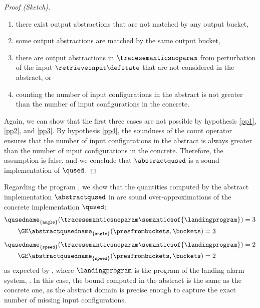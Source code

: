 \begin{proof}[Proof (Sketch)]
  \begin{enumerate}[label=(\alph*)]
    \item \label{qq1} there exist output abstractions that are not matched by any output bucket,
    \item \label{qq2} some output abstractions are matched by the same output bucket,
    \item \label{qq3} there are output abstractions in $\tracesemanticsnoparam$ from perturbation of the input $\retrieveinput\defstate$ that are not considered in the abstract, or
    \item \label{qq4} counting the number of input configurations in the abstract is not greater than the number of input configurations in the concrete.
  \end{enumerate}
  Again, we can show that the first three cases are not possible by hypothesis \ref{pp1}, \ref{pp2}, and \ref{pp3}. By hypothesis \ref{pp4}, the soundness of the count operator ensures that the number of input configurations in the abstract is always greater than the number of input configurations in the concrete. Therefore, the assumption is false, and we conclude that $\abstractqused$ is a sound implementation of $\qused$.
\end{proof}


\begin{example}
  Regarding the program , we show that the quantities computed by the abstract implementation $\abstractqused$ in  are sound over-approximations of the concrete implementation $\qused$:
  \begin{align*}
    & \qusedname_{\{\texttt{angle}\}}(\tracesemanticsnoparam\semanticsof{\landingprogram}) = 3 \\
    &\qquad\GE \abstractqusedname_{\{\texttt{angle}\}}(\presfrombuckets, \buckets) = 3
  \end{align*}
  \begin{align*}
    & \qusedname_{\{\texttt{speed}\}}(\tracesemanticsnoparam\semanticsof{\landingprogram}) = 2 \\
    &\qquad\GE \abstractqusedname_{\{\texttt{speed}\}}(\presfrombuckets, \buckets) = 2
  \end{align*}
  as expected by , where $\landingprogram$ is the program of the landing alarm system, \cf{} .
  In this case, the bound computed in the abstract is the same as the concrete one, as the abstract domain is precise enough to capture the exact number of missing input configurations.
\end{example}


